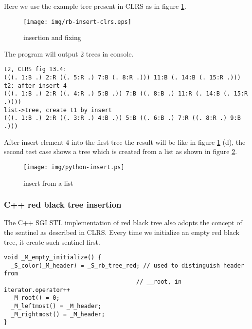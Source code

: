 \documentclass{article}
\begin{document}
Here we use the example tree present in CLRS as in figure \ref{fig:rb-insert-clrs}.

\begin{figure}[htbp]
       \begin{center}
	\texttt{[image: img/rb-insert-clrs.eps]}
        \caption{insertion and fixing} \label{fig:rb-insert-clrs}
       \end{center}
\end{figure}

The program will output 2 trees in console.

\begin{verbatim}
t2, CLRS fig 13.4:
(((. 1:B .) 2:R ((. 5:R .) 7:B (. 8:R .))) 11:B (. 14:B (. 15:R .)))
t2: after insert 4
(((. 1:B .) 2:R ((. 4:R .) 5:B .)) 7:B ((. 8:B .) 11:R (. 14:B (. 15:R .))))
list->tree, create t1 by insert
(((. 1:B .) 2:R ((. 3:R .) 4:B .)) 5:B ((. 6:B .) 7:R ((. 8:R .) 9:B .)))
\end{verbatim}

After insert element 4 into the first tree the result will be like in figure \ref{fig:rb-insert-clrs} (d), the second test case shows a tree which is created from a list as shown in figure \ref{fig:python-insert}.

\begin{figure}[htbp]
       \begin{center}
	\texttt{[image: img/python-insert.ps]}
        \caption{insert from a list} \label{fig:python-insert}
       \end{center}
\end{figure}

\subsubsection*{C++ red black tree insertion}

The C++ SGI STL implementation of red black tree also adopts the
concept of the sentinel as described in CLRS. Every time we initialize
an empty red black tree, it create such sentinel first.

\lstset{language=c++}
\begin{lstlisting}
void _M_empty_initialize() {
  _S_color(_M_header) = _S_rb_tree_red; // used to distinguish header from 
                                      // __root, in iterator.operator++
  _M_root() = 0;
  _M_leftmost() = _M_header;
  _M_rightmost() = _M_header;
}
\end{lstlisting}
\end{document}
